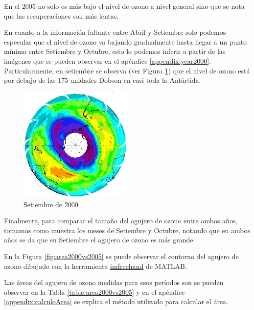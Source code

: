 \documentclass[a4paper]{article}
\begin{document}
En el 2005 no solo es más bajo el nivel de ozono a nivel general sino que se nota que las recuperaciones son más lentas.

En cuanto a la información faltante entre Abril y Setiembre solo podemos especular que el nivel de ozono va bajando gradualmente hasta llegar a un punto mínimo entre Setiembre y Octubre, esto lo podemos inferir a partir de las imágenes que se pueden observar en el apéndice \ref{appendix:year2000}. Particularmente, en setiembre se observa (ver Figura \ref{fig:set2000})  que el nivel de ozono está por debajo de las 175 unidades Dobson en casi toda la Antártida.

\begin{figure}[h!]
\centering
\includegraphics[width=0.5\textwidth]{assets/mini/09.jpg}
\caption{\label{fig:set2000}Setiembre de 2000}
\end{figure}

Finalmente, para comparar el tamaño del agujero de ozono entre ambos años, tomamos como muestra los meses de Setiembre y Octubre, notando que en ambos años se da que en Setiembre el agujero de ozono es más grande.

En la Figura \ref{fig:area2000vs2005} se puede observar el contorno del agujero de ozono dibujado con la herramienta \href{https://la.mathworks.com/help/images/ref/imfreehand.html}{imfreehand} de MATLAB.

Las áreas del agujero de ozono medidas para esos períodos son se pueden observar en la Tabla \ref{table:area2000vs2005} y en el apéndice \ref{appendix:calculoArea} se explica el método utilizado para calcular el área.
\end{document}
